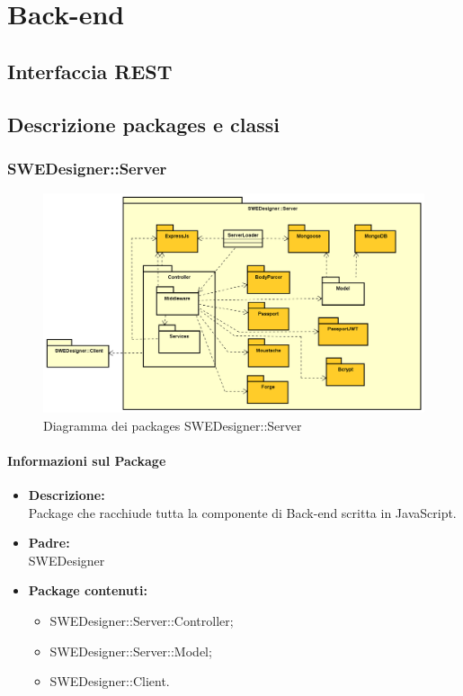 \section{Back-end}
	\subsection{Interfaccia REST}

	\subsection{Descrizione packages e classi}
	
		\subsubsection{SWEDesigner::Server}
		 \begin{figure}[h!]
		\centering
		\includegraphics[scale=0.4]{Disegnetti/Back-End.png}
		\caption{Diagramma dei packages SWEDesigner::Server}
 		\end{figure}
		\paragraph{Informazioni sul Package}
		\begin{itemize}				
			\item \textbf{Descrizione: }\\
			Package che racchiude tutta la componente di Back-end scritta in JavaScript.
			\item \textbf{Padre: }\\ SWEDesigner
			\item \textbf{Package contenuti: }
			\begin{itemize}
				\item SWEDesigner::Server::Controller;
				\item SWEDesigner::Server::Model;		
				\item SWEDesigner::Client.
			\end{itemize}
		\end{itemize}
		
